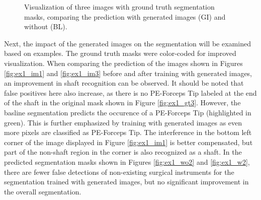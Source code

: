 \begin{figure}[bt]
    \hfill
    \vspace{0.3cm}
    \caption[Segmentation results experiment 1]{Visualization of three images with ground truth segmentation masks, comparing the prediction with generated images (GI) and without (BL).}\label{fig:ex1_showcase}
\end{figure}
Next, the impact of the generated images on the segmentation will be examined based on examples.
The ground truth masks were color-coded for improved visualization. 
When comparing the prediction of the images shown in Figures \ref{fig:ex1_im1} and \ref{fig:ex1_im3} before and after training with generated images, an improvement in shaft recognition can be observed. 
It should be noted that false positives here also increase, as there is no PE-Forceps Tip labeled at the end of the shaft in the original mask shown in Figure \ref{fig:ex1_gt3}.
However, the basline segmentation predicts the occurence of a PE-Forceps Tip (highlighted in green). This is further emphasized by training with generated images as even more pixels are classified as PE-Forceps Tip.
The interference in the bottom left corner of the image displayed in Figure \ref{fig:ex1_im1} is better compensated, but part of the non-shaft region in the corner is also recognized as a shaft. 
In the predicted segmentation masks shown in Figures \ref{fig:ex1_wo2} and \ref{fig:ex1_w2}, there are fewer false detections of non-existing surgical instruments for the segmentation trained with generated images, but no significant improvement in the overall segmentation.
\FloatBarrier
